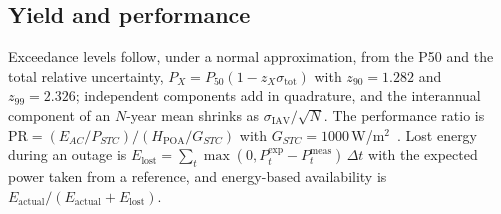 \subsection{Yield and performance}

Exceedance levels follow, under a normal approximation, from the P50 and the total relative uncertainty, $P_X=P_{50}(1-z_X\sigma_{\text{tot}})$ with $z_{90}=1.282$ and $z_{99}=2.326$; independent components add in quadrature, and the interannual component of an $N$-year mean shrinks as $\sigma_{\text{IAV}}/\sqrt N$. The performance ratio is $\text{PR}=(E_{AC}/P_{STC})/(H_{\text{POA}}/G_{STC})$ with $G_{STC}=1000$\,W/m$^2$~\cite{iec61724-1}. Lost energy during an outage is $E_{\text{lost}}=\sum_t\max(0,P^{\text{exp}}_t-P^{\text{meas}}_t)\,\Delta t$ with the expected power taken from a reference, and energy-based availability is $E_{\text{actual}}/(E_{\text{actual}}+E_{\text{lost}})$.
